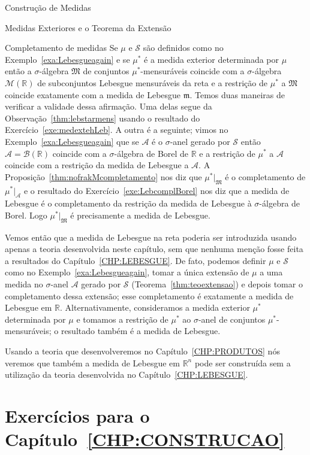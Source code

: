 \documentclass[oneside,final,11pt]{amsbook}
\newcommand{\R}{\mathds R}
\newcommand{\leb}{\mathfrak m}
\newcommand{\Borel}{\mathcal B}
\newcommand{\Lebmens}{\mathcal M}
\theoremstyle{remark}\newtheorem{exercise}{Exercício}[chapter]
\theoremstyle{remark}\newtheorem{*exercise}[exercise]{\hbox to 0pt{\hskip 0pt minus 1fil*}Exercício}
\theoremstyle{definition}\newtheorem{exdefin}{Definição}[chapter]
\theoremstyle{plain}\newtheorem{teo}{Teorema}[section]
\theoremstyle{plain}\newtheorem{lem}[teo]{Lema}
\theoremstyle{plain}\newtheorem{prop}[teo]{Proposição}
\theoremstyle{plain}\newtheorem{cor}[teo]{Corolário}
\theoremstyle{definition}\newtheorem{defin}[teo]{Definição}
\theoremstyle{remark}\newtheorem{rem}[teo]{Observação}
\theoremstyle{definition}\newtheorem{notation}[teo]{Notação}
\theoremstyle{definition}\newtheorem{convention}[teo]{Convenção}
\theoremstyle{definition}\newtheorem{example}[teo]{Exemplo}
\numberwithin{section}{chapter}
\numberwithin{equation}{section}
\begin{document}
\begin{chapter}{Construção de Medidas}
\begin{section}{Medidas Exteriores e o Teorema da Extensão}
\begin{subsection}{Completamento de medidas}
Se $\mu$ e $\mathcal S$ são definidos como no Exemplo~\ref{exa:Lebesgueagain} e
se $\mu^*$ é a medida exterior determinada por $\mu$
então a $\sigma$-álgebra $\mathfrak M$ de conjuntos $\mu^*$-mensuráveis coincide
com a $\sigma$-álgebra $\Lebmens(\R)$ de subconjuntos Lebesgue mensuráveis da reta e a restrição
de $\mu^*$ a $\mathfrak M$ coincide exatamente com a medida de Lebesgue $\leb$. Temos duas
maneiras de verificar a validade dessa afirmação. Uma delas segue da Observação~\ref{thm:lebstarmens}
usando o resultado do Exercício~\ref{exe:medextehLeb}. A outra é a seguinte; vimos
no Exemplo~\ref{exa:Lebesgueagain} que se $\mathcal A$ é o $\sigma$-anel gerado por
$\mathcal S$ então $\mathcal A=\Borel(\R)$ coincide com a $\sigma$-álgebra
de Borel de $\R$ e a restrição de $\mu^*$ a $\mathcal A$ coincide com a restrição da medida
de Lebesgue a $\mathcal A$. A Proposição~\ref{thm:nofrakMcompletamento} nos diz
que $\mu^*\vert_{\mathfrak M}$ é o completamento de $\mu^*\vert_{\mathcal A}$
e o resultado do Exercício~\ref{exe:LebcomplBorel} nos diz que a medida de Lebesgue é o completamento
da restrição da medida de Lebesgue à $\sigma$-álgebra de Borel. Logo $\mu^*\vert_{\mathfrak M}$
é precisamente a medida de Lebesgue.

Vemos então que a medida de Lebesgue na reta poderia ser introduzida usando apenas a teoria desenvolvida
neste capítulo, sem que nenhuma menção fosse feita a resultados do Capítulo~\ref{CHP:LEBESGUE}.
De fato, podemos definir $\mu$ e $\mathcal S$ como no Exemplo~\ref{exa:Lebesgueagain},
tomar a única extensão de $\mu$ a uma medida no $\sigma$-anel $\mathcal A$
gerado por $\mathcal S$ (Teorema~\ref{thm:teoextensao}) e depois tomar o completamento dessa extensão; esse completamento
é exatamente a medida de Lebesgue em $\R$. Alternativamente, consideramos a medida exterior
$\mu^*$ determinada por $\mu$ e tomamos a restrição
de $\mu^*$ ao $\sigma$-anel de conjuntos $\mu^*$-mensuráveis; o resultado também é a
medida de Lebesgue.

Usando a teoria que desenvolveremos no Capítulo~\ref{CHP:PRODUTOS} nós veremos que também
a medida de Lebesgue em $\R^n$ pode ser construída sem a utilização da teoria
desenvolvida no Capítulo~\ref{CHP:LEBESGUE}.

\end{subsection}

\end{section}

\section*{Exercícios para o Capítulo~\ref{CHP:CONSTRUCAO}}


\end{chapter}
\end{document}
